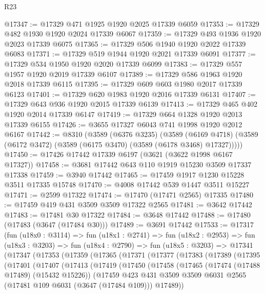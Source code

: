 \begin{lexlean}{R23}
\begin{coremodule}
@17347 := @17329 @471 @1925 @1920 @2025 @17339 @6059
@17353 := @17329 @482 @1930 @1920 @2024 @17339 @6067
@17359 := @17329 @493 @1936 @1920 @2023 @17339 @6075
@17365 := @17329 @506 @1940 @1920 @2022 @17339 @6083
@17371 := @17329 @519 @1944 @1920 @2021 @17339 @6091
@17377 := @17329 @534 @1950 @1920 @2020 @17339 @6099
@17383 := @17329 @557 @1957 @1920 @2019 @17339 @6107
@17389 := @17329 @586 @1963 @1920 @2018 @17339 @6115
@17395 := @17329 @609 @603 @1980 @2017 @17339 @6123
@17401 := @17329 @620 @1983 @1920 @2016 @17339 @6131
@17407 := @17329 @643 @936 @1920 @2015 @17339 @6139
@17413 := @17329 @465 @402 @1920 @2014 @17339 @6147
@17419 := @17329 @664 @1328 @1920 @2013 @17339 @6155
@17426 := @3655 @17327 @6043 @741 @1998 @1920 @2012 @6167
@17442 := @8310
    (@3589
      (@6376 @3235)
      (@3589
        (@6169 @4718)
        (@3589 (@6172 @3472) (@3589 (@6175 @3470) (@3589 (@6178 @3468) @17327)))))
@17450 := @17426 @17442 @17339 @6197 (@3621 (@3622 @1998 @6167 @17327))
@17458 := @3681 @17442 @643 @110 @1919 @15230 @3509 @17337 @17338
@17459 := @3940 @17442
@17465 := @17459 @1917 @1230 @15228 @3511 @17335 @15748
@17470 := @4008 @17442 @539 @1447 @3511 @15227
@17471 := @2599 @17322
@17474 := @17470 (@17471 @2565) @17335
@17480 := @17459 @419 @431 @3509 @3509 @17322 @2565
@17481 := @3642 @17442
@17483 := @17481 @30 @17322
@17484 := @3648 @17442
@17488 := @17480 (@17483 (@3647 (@17484 @30)))
@17489 := @3691 @17442
@17533 := @17317
    (fun (u18x0 : @3114) =>
    fun (u18x1 : @2741) =>
    fun (u18x2 : @2953) =>
    fun (u18x3 : @3203) =>
    fun (u18x4 : @2790) =>
    fun (u18x5 : @3203) =>
    @17341
      (@17347
        (@17353
          (@17359
            (@17365
              (@17371
                (@17377
                  (@17383
                    (@17389
                      (@17395
                        (@17401
                          (@17407
                            (@17413
                              (@17419
                                (@17450
                                  (@17458
                                    (@17465
                                      (@17474 (@17488 @17489) (@15432 @15226))
                                      (@17459
                                        @423
                                        @431
                                        @3509
                                        @3509
                                        @6031
                                        @2565
                                        (@17481 @109 @6031 (@3647 (@17484 @109)))
                                        @17489))

\end{coremodule}
\end{lexlean}
